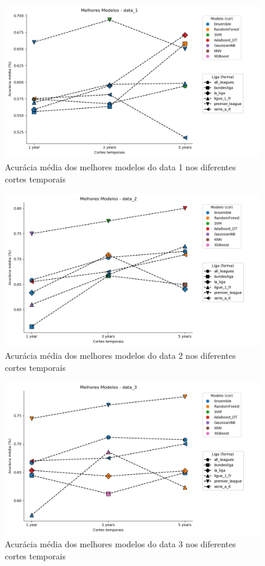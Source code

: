 \documentclass[a4paper]{article}
\theoremstyle{plain}
\theoremstyle{definition}
\begin{document}
\begin{figure}[H]
    \centering
    \includegraphics[width=1\textwidth]{Figures/years_data1.png}
    \caption{Acurácia média dos melhores modelos do data 1 nos diferentes cortes temporais}
    \label{fig:Figura4}
\end{figure}

\begin{figure}[H]
    \centering
    \includegraphics[width=1\textwidth]{Figures/years_data2.png}
    \caption{Acurácia média dos melhores modelos do data 2 nos diferentes cortes temporais}
    \label{fig:Figura5}
\end{figure}

\begin{figure}[H]
    \centering
    \includegraphics[width=1\textwidth]{Figures/years_data3.png}
    \caption{Acurácia média dos melhores modelos do data 3 nos diferentes cortes temporais}
    \label{fig:Figura6}
\end{figure}
\end{document}
